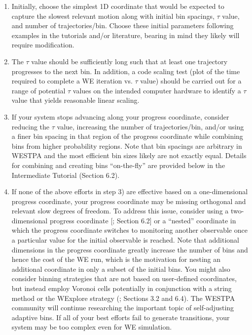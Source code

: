 \documentclass[9pt,tutorial]{livecoms}
\begin{document}
\begin{enumerate}
\item Initially, choose the simplest 1D coordinate that would be expected to capture the slowest relevant motion along with initial bin spacings, $\tau$ value, and number of trajectories/bin. 
Choose these initial parameters following examples in the tutorials and/or literature, bearing in mind they likely will require modification.
\item The $\tau$ value should be sufficiently long such that at least one trajectory progresses to the next bin. 
In addition, a code scaling test (plot of the time required to complete a WE iteration vs. $\tau$ value) should be carried out for a range of potential $\tau$ values on the intended computer hardware to identify a $\tau$ value that yields reasonable linear scaling. 
\item If your system stops advancing along your progress coordinate, consider reducing the $\tau$ value, increasing the number of trajectories/bin, and/or using a finer bin spacing in that region of the progress coordinate while combining bins from higher probability regions. 
Note that bin spacings are arbitrary in WESTPA and the most efficient bin sizes likely are not exactly equal. 
Details for combining and creating bins “on-the-fly” are provided below in the Intermediate Tutorial (Section 6.2). 
\item If none of the above efforts in step 3) are effective based on a one-dimensional progress coordinate, your progress coordinate may be missing orthogonal and relevant slow degrees of freedom. 
To address this issue, consider using a two-dimensional progress coordinate [\citep{Saglam2019,Zwier2016}; Section 6.2] or a “nested” coordinate in which the progress coordinate switches to monitoring another observable once a particular value for the initial observable is reached. 
Note that additional dimensions in the progress coordinate greatly increase the number of bins and hence the cost of the WE run, which is the motivation for nesting an additional coordinate in only a subset of the initial bins. 
You might also consider binning strategies that are not based on user-defined coordinates, but instead employ Voronoi cells potentially in conjunction with a string method or the WExplore strategy (\citep{Dickson2014}; Sections 3.2 and 6.4). 
The WESTPA community will continue researching the important topic of self-adjusting adaptive bins. 
If all of your best efforts fail to generate transitions, your system may be too complex even for WE simulation.
\end{enumerate}
\end{document}
